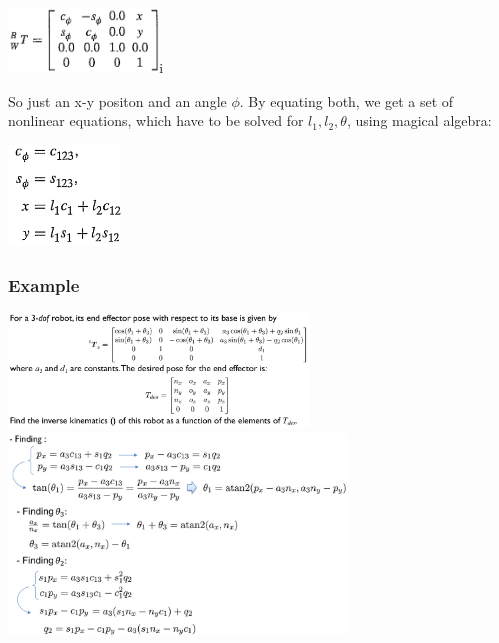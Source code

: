 {\centering 
\includegraphics[width=4cm]{sections/imgs/16.png}i
\\}

So just an x-y positon and an angle \(\phi\).
By equating both, we get a set of nonlinear equations, which have to be solved for $ l_1 , l_{2} , \theta $, using magical algebra:

{\centering 
\includegraphics[width=3cm]{sections/imgs/17.png}
\\}

\subsubsection{Example}

\begin{center}
	\includegraphics[width=8cm]{sections/imgs/18.png}\\
	\includegraphics[width=9cm]{sections/imgs/19.png}
\end{center}

